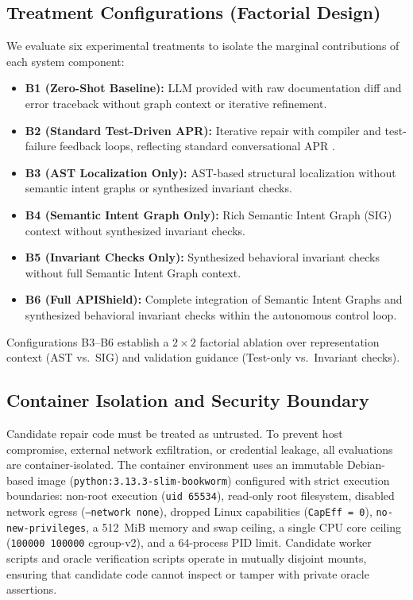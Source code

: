\subsection{Treatment Configurations (Factorial Design)}
We evaluate six experimental treatments to isolate the marginal contributions of each system component:
\begin{itemize}
    \item \textbf{B1 (Zero-Shot Baseline):} LLM provided with raw documentation diff and error traceback without graph context or iterative refinement.
    \item \textbf{B2 (Standard Test-Driven APR):} Iterative repair with compiler and test-failure feedback loops, reflecting standard conversational APR \cite{chatrepair2024}.
    \item \textbf{B3 (AST Localization Only):} AST-based structural localization without semantic intent graphs or synthesized invariant checks.
    \item \textbf{B4 (Semantic Intent Graph Only):} Rich Semantic Intent Graph (SIG) context without synthesized invariant checks.
    \item \textbf{B5 (Invariant Checks Only):} Synthesized behavioral invariant checks without full Semantic Intent Graph context.
    \item \textbf{B6 (Full APIShield):} Complete integration of Semantic Intent Graphs and synthesized behavioral invariant checks within the autonomous control loop.
\end{itemize}
Configurations B3--B6 establish a $2 \times 2$ factorial ablation over representation context (AST vs.\ SIG) and validation guidance (Test-only vs.\ Invariant checks).

\subsection{Container Isolation and Security Boundary}
Candidate repair code must be treated as untrusted. To prevent host compromise, external network exfiltration, or credential leakage, all evaluations are container-isolated. The container environment uses an immutable Debian-based image (\texttt{python:3.13.3-slim-bookworm}) configured with strict execution boundaries: non-root execution (\texttt{uid 65534}), read-only root filesystem, disabled network egress (\texttt{--network none}), dropped Linux capabilities (\texttt{CapEff = 0}), \texttt{no-new-privileges}, a 512~MiB memory and swap ceiling, a single CPU core ceiling (\texttt{100000 100000} cgroup-v2), and a 64-process PID limit. Candidate worker scripts and oracle verification scripts operate in mutually disjoint mounts, ensuring that candidate code cannot inspect or tamper with private oracle assertions.

